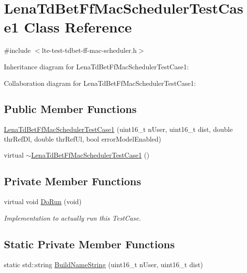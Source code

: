\hypertarget{classLenaTdBetFfMacSchedulerTestCase1}{}\section{Lena\+Td\+Bet\+Ff\+Mac\+Scheduler\+Test\+Case1 Class Reference}
\label{classLenaTdBetFfMacSchedulerTestCase1}


{\ttfamily \#include $<$lte-\/test-\/tdbet-\/ff-\/mac-\/scheduler.\+h$>$}



Inheritance diagram for Lena\+Td\+Bet\+Ff\+Mac\+Scheduler\+Test\+Case1\+:


Collaboration diagram for Lena\+Td\+Bet\+Ff\+Mac\+Scheduler\+Test\+Case1\+:
\subsection*{Public Member Functions}
\begin{DoxyCompactItemize}
\item 
\hyperlink{classLenaTdBetFfMacSchedulerTestCase1_a7b55ffb39c022ac79275cbd9b9de7ccc}{Lena\+Td\+Bet\+Ff\+Mac\+Scheduler\+Test\+Case1} (uint16\+\_\+t n\+User, uint16\+\_\+t dist, double thr\+Ref\+Dl, double thr\+Ref\+Ul, bool error\+Model\+Enabled)
\item 
virtual \hyperlink{classLenaTdBetFfMacSchedulerTestCase1_a3fe4b5cf32cd2e6ce57114984941963f}{$\sim$\+Lena\+Td\+Bet\+Ff\+Mac\+Scheduler\+Test\+Case1} ()
\end{DoxyCompactItemize}
\subsection*{Private Member Functions}
\begin{DoxyCompactItemize}
\item 
virtual void \hyperlink{classLenaTdBetFfMacSchedulerTestCase1_a7d559a1158bc847fbf816ed856b7b8eb}{Do\+Run} (void)
\begin{DoxyCompactList}\small\item\em Implementation to actually run this Test\+Case. \end{DoxyCompactList}\end{DoxyCompactItemize}
\subsection*{Static Private Member Functions}
\begin{DoxyCompactItemize}
\item 
static std\+::string \hyperlink{classLenaTdBetFfMacSchedulerTestCase1_a400284d13ddc4bb4806e7ee9a93c91eb}{Build\+Name\+String} (uint16\+\_\+t n\+User, uint16\+\_\+t dist)
\end{DoxyCompactItemize}
